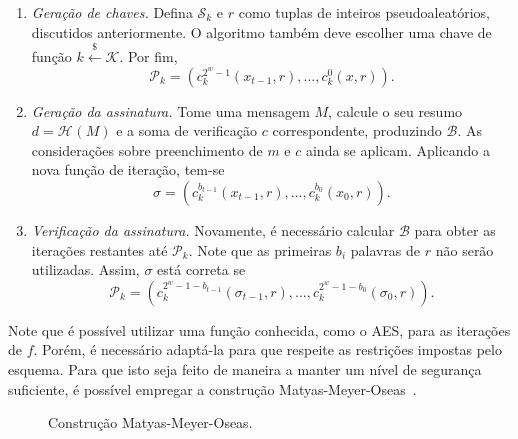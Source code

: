 \documentclass{ufsctex/ufsctex}
\newcommand{\pk}{\mathcal{P}_k}
\newcommand{\sk}{\mathcal{S}_k}
\newcommand{\hash}[2][]{\mathcal{H}^{#1} (#2)}
\begin{document}
\begin{enumerate}

  \item[] \emph{Geração de chaves.} Defina $\sk{}$ e $r$ como tuplas de
      inteiros pseudoaleatórios, discutidos anteriormente. O algoritmo também
        deve escolher uma chave de função $k \stackrel{\$}\longleftarrow
        \mathcal{K}$. Por fim,
        \begin{equation}
          \pk{} = (c^{2^w-1}_{k}(x_{t-1}, r), \dots, c^{0}_{k}(x, r)).
        \end{equation}

  \item[] \emph{Geração da assinatura.} Tome uma mensagem $M$, calcule o seu
      resumo $d = \hash{M}$ e a soma de verificação $c$ correspondente,
        produzindo $\mathcal{B}$. As considerações sobre preenchimento de $m$ e
        $c$ ainda se aplicam. Aplicando a nova função de iteração, tem-se
        \begin{equation}
          \sigma = (c^{b_{t - 1}}_{k}(x_{t-1}, r),
            \dots, c^{b_{0}}_{k}(x_{0}, r)).
        \end{equation}

  \item[] \emph{Verificação da assinatura.} Novamente, é necessário calcular
      $\mathcal{B}$ para obter as iterações restantes até $\pk{}$. Note que as
        primeiras $b_i$ palavras de $r$ não serão utilizadas. Assim, $\sigma$
        está correta se
        \begin{equation}
          \pk{} = (c^{2^{w} - 1 - b_{t - 1}}_{k}(\sigma_{t-1}, r),
            \dots, c^{2^{w} - 1 - b_{0}}_{k}(\sigma_{0}, r)).
        \end{equation}

\end{enumerate}

Note que é possível utilizar uma função conhecida, como o AES, para as
iterações de $f$. Porém, é necessário adaptá-la para que respeite as restrições
impostas pelo esquema. Para que isto seja feito de maneira a manter um nível de
segurança suficiente, é possível empregar a construção
Matyas-Meyer-Oseas~\cite[9.41]{Menezes:1996:HAC:548089}.

\begin{figure}
  \centering
  \caption{Construção Matyas-Meyer-Oseas.}\label{fig:6}
\end{figure}
\end{document}
